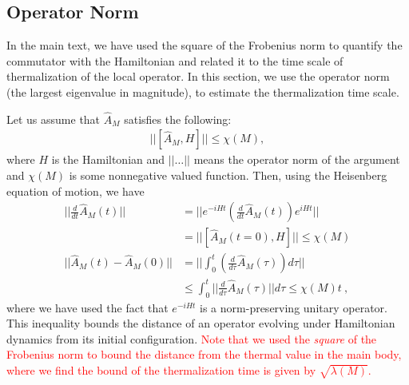 \documentclass[twocolumn,superscriptaddress, prl,showpacs]{revtex4-1}
\newcommand{\addr}[1]{\textcolor{red}{#1}}
\begin{document}
\subsection{Operator Norm}
In the main text, we have used the square of the Frobenius norm to quantify the commutator with the Hamiltonian
and related it to the time scale of thermalization of the local operator.
In this section, we use the operator norm (the largest eigenvalue in magnitude),
to estimate the thermalization time scale.


Let us assume that $\hat{A}_M$ satisfies the following:
\begin{align}
||[\hat{A}_M, H]|| \leq \chi(M),
\end{align}
where $H$ is the Hamiltonian and $||\ldots||$ means the operator norm of the argument and $\chi(M)$ is some nonnegative valued function.
Then, using the Heisenberg equation of motion, we have
\begin{align}
\bigg|\bigg|\frac{d}{dt} \hat{A}_M(t)\bigg|\bigg| &= \bigg|\bigg| e^{-i H t} \left(\frac{d}{dt} \hat{A}_M (t)\right) e^{i H t} \bigg|\bigg| \nonumber\\
&= ||[\hat{A}_M(t = 0), H]|| \leq \chi(M) \\
||\hat{A}_M(t) - \hat{A}_M(0)|| &= \bigg|\bigg|\int_0^t \left(\frac{d}{d\tau} \hat{A}_M(\tau)\right)d\tau \bigg|\bigg| \nonumber\\
&\leq \int^t_0 \big|\big|\frac{d}{d\tau} \hat{A}_M(\tau)\big|\big|d\tau \leq \chi(M) t ~,
\end{align}
where we have used the fact that $e^{-iHt}$ is a norm-preserving unitary operator.
This inequality bounds the distance of an operator evolving under Hamiltonian dynamics
from its initial configuration. 
\addr{Note that we used the {\it square} of the Frobenius norm to bound the distance 
from the thermal value in the main body, where we find the bound of the thermalization time is given by $\sqrt{\lambda(M)}$.}
\end{document}
